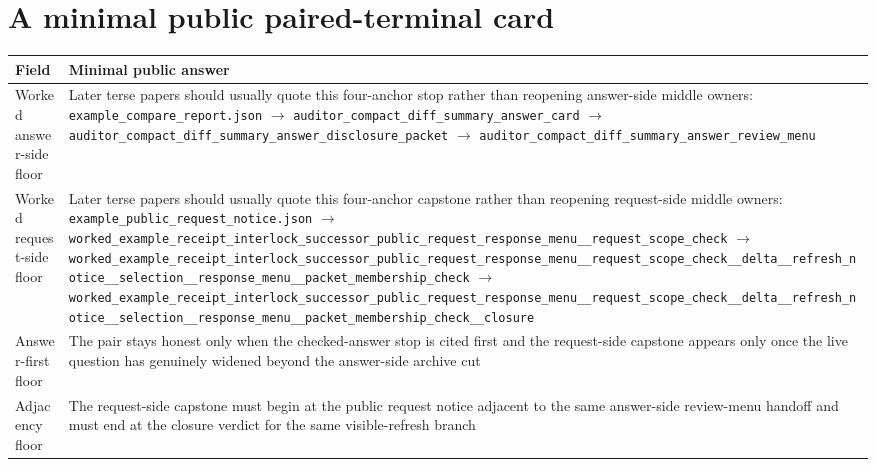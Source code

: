 \documentclass[11pt]{article}
\begin{document}
\section{A minimal public paired-terminal card}
\begin{table}[t]
\centering
\small
\begin{tabularx}{\linewidth}{@{}lX@{}}
\toprule
Field & Minimal public answer \\
\midrule
Worked answer-side floor & Later terse papers should usually quote this four-anchor stop rather than reopening answer-side middle owners:\newline
\texttt{\nolinkurl{example_compare_report.json}}\newline
$\to$\newline
\texttt{\nolinkurl{auditor_compact_diff_summary_answer_card}}\newline
$\to$\newline
\texttt{\nolinkurl{auditor_compact_diff_summary_answer_disclosure_packet}}\newline
$\to$\newline
\texttt{\nolinkurl{auditor_compact_diff_summary_answer_review_menu}} \\
Worked request-side floor & Later terse papers should usually quote this four-anchor capstone rather than reopening request-side middle owners:\newline
\texttt{\nolinkurl{example_public_request_notice.json}}\newline
$\to$\newline
\texttt{\nolinkurl{worked_example_receipt_interlock_successor_public_request_response_menu__request_scope_check}}\newline
$\to$\newline
\texttt{\nolinkurl{worked_example_receipt_interlock_successor_public_request_response_menu__request_scope_check__delta__refresh_notice__selection__response_menu__packet_membership_check}}\newline
$\to$\newline
\texttt{\nolinkurl{worked_example_receipt_interlock_successor_public_request_response_menu__request_scope_check__delta__refresh_notice__selection__response_menu__packet_membership_check__closure}} \\
Answer-first floor & The pair stays honest only when the checked-answer stop is cited first and the request-side capstone appears only once the live question has genuinely widened beyond the answer-side archive cut \\
Adjacency floor & The request-side capstone must begin at the public request notice adjacent to the same answer-side review-menu handoff and must end at the closure verdict for the same visible-refresh branch \\

\end{tabularx}
\end{table}
\end{document}
